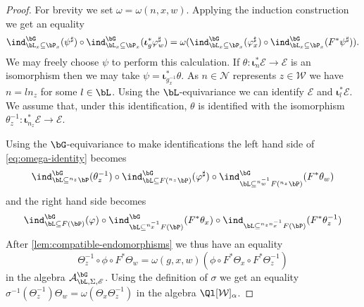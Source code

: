 \documentclass[eqthmnum,nocolour,skinny]{jt-calcs}
\begin{document}
\begin{proof}
For brevity we set $\omega = \omega(n,x,w)$. Applying the induction construction we get an equality
\begin{equation}\label{eq:omega-identity}
\ind_{\bL_x \subseteq \bP_x}^{\bG}(\psi^{\sharp}) \circ \ind_{\bL_x \subseteq \bP_x}^{\bG}(\boldsymbol{\iota}_g^*\varphi_w^{\sharp}) = \omega(\ind_{\bL_x \subseteq \bP_x}^{\bG}(\varphi_x^{\sharp}) \circ \ind_{\bL_x \subseteq \bP_x}^{\bG}(F^*\psi^{\sharp})).
\end{equation}
We may freely choose $\psi$ to perform this calculation. If $\theta : \boldsymbol{\iota}_n^*\mathscr{E} \to \mathscr{E}$ is an isomorphism then we may take $\psi = \boldsymbol{\iota}_{g_x^{-1}}^*\theta$. As $n \in \mathcal{N}$ represents $z \in \mathcal{W}$ we have $n = ln_z$ for some $l \in \bL$. Using the $\bL$-equivariance we can identify $\mathscr{E}$ and $\boldsymbol{\iota}_l^*\mathscr{E}$. We assume that, under this identification, $\theta$ is identified with the isomorphism $\theta_z^{-1} : \boldsymbol{\iota}_{n_z}^*\mathscr{E} \to \mathscr{E}$.

Using the $\bG$-equivariance to make identifications the left hand side of \cref{eq:omega-identity} becomes
\begin{equation*}
\ind_{\bL \subseteq {}^{n_z}\bP}^{\bG}(\theta_z^{-1}) \circ \ind_{\bL \subseteq F({}^{n_z}\bP)}^{\bG}(\varphi^{\sharp}) \circ \ind_{\bL \subseteq {}^{n_w^{-1}}F({}^{n_z}\bP)}^{\bG}(F^*\theta_w)
\end{equation*}
and the right hand side becomes
\begin{equation*}
\ind_{\bL \subseteq F(\bP)}^{\bG}(\varphi) \circ \ind_{\bL \subseteq {}^{n_x^{-1}}F(\bP)}^{\bG}(F^*\theta_x) \circ \ind_{\bL \subseteq {}^{n_zn_x^{-1}}F(\bP)}(F^*\theta_z^{-1})
\end{equation*}
After \cref{lem:compatible-endomorphisms} we thus have an equality
\begin{equation*}
\Theta_z^{-1} \circ \phi \circ F^*\Theta_w = \omega(g,x,w)(\phi \circ F^*\Theta_x \circ F^*\Theta_z^{-1})
\end{equation*}
in the algebra $\mathcal{A}_{\bL,\Sigma,\mathscr{E}}^{\bG}$. Using the definition of $\sigma$ we get an equality $\sigma^{-1}(\Theta_z^{-1})\Theta_w = \omega(\Theta_x\Theta_z^{-1})$ in the algebra $\Ql[\mathcal{W}]_{\alpha}$.


\end{proof}
\end{document}
